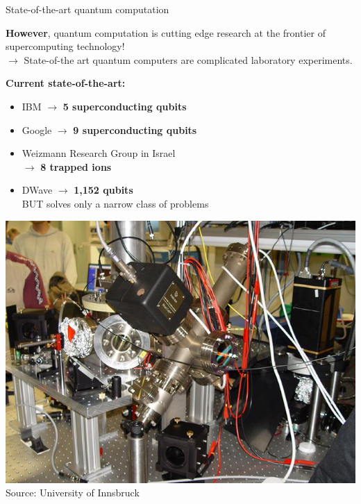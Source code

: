 \documentclass[10pt]{beamer}
\begin{document}
{
\begin{frame}[fragile]{State-of-the-art quantum computation}

\textbf{However}, quantum computation is cutting edge research at the frontier of supercomputing technology!\\
\vspace{0.1cm}
$\rightarrow$ State-of-the art quantum computers are complicated laboratory experiments.

\begin{minipage}[c]{0.59\textwidth}
\vspace{0.3cm}
\textbf{Current state-of-the-art:}\\
\begin{itemize}
\item IBM $\rightarrow$ \textbf{5 superconducting qubits}
\item Google $\rightarrow$ \textbf{9 superconducting qubits}
\item Weizmann Research Group in Israel\\$\rightarrow$ \textbf{8 trapped ions}
\item DWave $\rightarrow$ \textbf{1,152 qubits}\\BUT solves only a narrow class of problems
\end{itemize}
\end{minipage}%
\begin{minipage}[c]{0.39\textwidth}
\includegraphics[scale=0.18]{ion-trap.jpg}\\
\centering
\tiny{Source: University of Innsbruck}
\end{minipage}

\end{frame}
}
\end{document}
